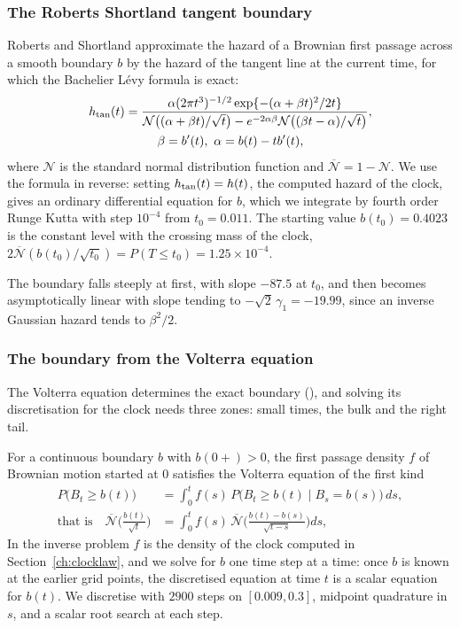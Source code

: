 \subsubsection{The Roberts Shortland tangent boundary}\label{sec:ch19:tangent}

Roberts and Shortland \cite{RS95} approximate the hazard of a Brownian first passage across a smooth boundary $b$ by the hazard of the tangent line at the current time, for which the Bachelier L\'evy formula is exact:
\begin{gather*}
h_{\rm tan}(t)=\frac{\alpha(2\pi t^3)^{-1/2}\exp\{-(\alpha+\beta t)^2/2t\}}{\mathcal N\big((\alpha+\beta t)/\sqrt t\big)-e^{-2\alpha\beta}\mathcal N\big((\beta t-\alpha)/\sqrt t\big)},\\
\beta=b'(t),\ \alpha=b(t)-tb'(t),
\end{gather*}
where $\mathcal N$ is the standard normal distribution function and $\overline{\mathcal N}=1-\mathcal N$. We use the formula in reverse: setting $h_{\rm tan}(t)=h(t)$, the computed hazard of the clock, gives an ordinary differential equation for $b$, which we integrate by fourth order Runge Kutta with step $10^{-4}$ from $t_0=0.011$. The starting value $b(t_0)=0.4023$ is the constant level with the crossing mass of the clock, $2\overline{\mathcal N}(b(t_0)/\sqrt{t_0})=P(T\le t_0)=1.25\times10^{-4}$.

The boundary falls steeply at first, with slope $-87.5$ at $t_0$, and then becomes asymptotically linear with slope tending to $-\sqrt2\,\gamma_1=-19.99$, since an inverse Gaussian hazard tends to $\beta^2/2$.

\subsubsection{The boundary from the Volterra equation}\label{sec:ch19:zones}

The Volterra equation determines the exact boundary (\cite[Theorems 9.1 and 9.2]{EkstromJanson16}), and solving its discretisation for the clock needs three zones: small times, the bulk and the right tail.

For a continuous boundary $b$ with $b(0+)>0$, the first passage density $f$ of Brownian motion started at $0$ satisfies the Volterra equation of the first kind \cite{Peskir02}
\begin{equation}\label{eq:ch19:volterra}
\begin{aligned}
P\big(B_t\ge b(t)\big)&=\int_0^tf(s)\,P\big(B_t\ge b(t)\mid B_s=b(s)\big)\,ds,\\
\text{that is}\quad\overline{\mathcal N}\Big(\frac{b(t)}{\sqrt t}\Big)&=\int_0^tf(s)\,\overline{\mathcal N}\Big(\frac{b(t)-b(s)}{\sqrt{t-s}}\Big)ds,
\end{aligned}
\end{equation}
In the inverse problem $f$ is the density of the clock computed in Section~\ref{ch:clocklaw}, and we solve for $b$ one time step at a time: once $b$ is known at the earlier grid points, the discretised equation at time $t$ is a scalar equation for $b(t)$. We discretise with $2900$ steps on $[0.009,0.3]$, midpoint quadrature in $s$, and a scalar root search at each step.

